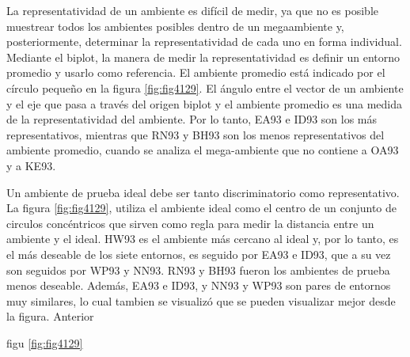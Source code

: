 La representatividad de un ambiente es difícil de medir, ya que no es posible muestrear todos los ambientes posibles dentro de un megaambiente y, posteriormente, determinar la representatividad de cada uno en forma individual. Mediante el biplot, la manera de medir la representatividad es definir un entorno promedio y usarlo como referencia. El ambiente promedio está indicado por el círculo pequeño en la figura \ref{fig:fig4129}. El ángulo entre el vector de un ambiente y el eje que pasa a través del origen biplot y el ambiente promedio es una medida de la representatividad del ambiente. Por lo tanto, EA93 e ID93 son los más representativos, mientras que RN93 y BH93 son los menos representativos del ambiente promedio, cuando se analiza el mega-ambiente que no contiene a OA93 y a KE93.

Un ambiente de prueba ideal debe ser tanto discriminatorio como representativo. La figura \ref{fig:fig4129}, utiliza el ambiente ideal como el centro de un conjunto de circulos concéntricos que sirven como regla para medir la distancia entre un ambiente y el ideal. HW93 es el ambiente más cercano al ideal y, por lo tanto, es el más deseable de los siete entornos, es seguido por EA93 e ID93, que a su vez son seguidos por WP93 y NN93. RN93 y BH93 fueron los ambientes de prueba menos deseable. Además, EA93 e ID93, y NN93 y WP93 son pares de entornos muy similares, lo cual tambien se visualizó que se pueden visualizar mejor desde la figura. Anterior


figu \ref{fig:fig4129}



